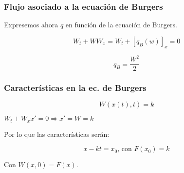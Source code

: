 		\subsubsection{Flujo asociado a la ecuación de Burgers}

			Expresemos ahora $q$ en función de la ecuación de Burgers.

			$$W_t + WW_x = W_t + [q_B(w)]_x = 0$$

			$$q_{B} = \frac{W^2}{2}$$


		\subsubsection{Características en la ec. de Burgers}

			$$W(x(t),t) = k$$

			$W_t + W_x x' = 0 \Rightarrow x' = W = k$

			Por lo que las características serán:

			$$x-kt = x_0 \text{, con }F(x_0) = k$$

			\begin{figure}[hbtp]
				\centering
				\caption{}
				\label{fig:CaracteristicasBurger}
			\end{figure}

			Con $W(x,0) = F(x)$.

